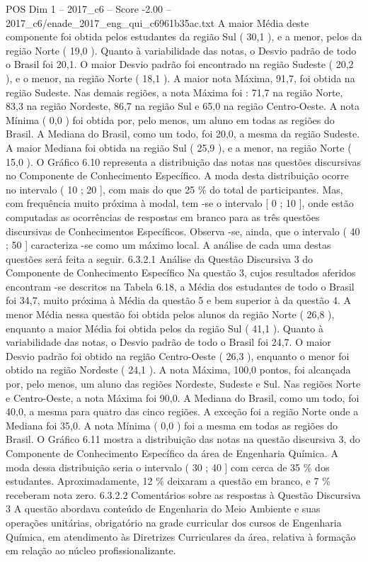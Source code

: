 \begin{textsample}{POS Dim 1 – 2017\_c6 – Score -2.00 – 2017\_c6/enade\_2017\_eng\_qui\_c6961b35ac.txt}
A maior Média deste componente foi obtida pelos estudantes da região Sul ( 30,1 ), e a menor, pelos da região Norte ( 19,0 ).
Quanto à variabilidade das notas, o Desvio padrão de todo o Brasil foi 20,1.
O maior Desvio padrão foi encontrado na região Sudeste ( 20,2 ), e o menor, na região Norte ( 18,1 ).
A maior nota Máxima, 91,7, foi obtida na região Sudeste.
Nas demais regiões, a nota Máxima foi : 71,7 na região Norte, 83,3 na região Nordeste, 86,7 na região Sul e 65,0 na região Centro-Oeste.
A nota Mínima ( 0,0 ) foi obtida por, pelo menos, um aluno em todas as regiões do Brasil.
A Mediana do Brasil, como um todo, foi 20,0, a mesma da região Sudeste.
A maior Mediana foi obtida na região Sul ( 25,9 ), e a menor, na região Norte ( 15,0 ).
O Gráfico 6.10 representa a distribuição das notas nas questões discursivas no Componente de Conhecimento Específico.
A moda desta distribuição ocorre no intervalo ( 10 ; 20 ], com mais do que 25 \% do total de participantes.
Mas, com frequência muito próxima à modal, tem -se o intervalo [ 0 ; 10 ], onde estão computadas as ocorrências de respostas em branco para as três questões discursivas de Conhecimentos Específicos.
Observa -se, ainda, que o intervalo ( 40 ; 50 ] caracteriza -se como um máximo local.
A análise de cada uma destas questões será feita a seguir. 6.3.2.1 Análise da Questão Discursiva 3 do Componente de Conhecimento Específico Na questão 3, cujos resultados aferidos encontram -se descritos na Tabela 6.18, a Média dos estudantes de todo o Brasil foi 34,7, muito próxima à Média da questão 5 e bem superior à da questão 4.
A menor Média nessa questão foi obtida pelos alunos da região Norte ( 26,8 ), enquanto a maior Média foi obtida pelos da região Sul ( 41,1 ).
Quanto à variabilidade das notas, o Desvio padrão de todo o Brasil foi 24,7.
O maior Desvio padrão foi obtido na região Centro-Oeste ( 26,3 ), enquanto o menor foi obtido na região Nordeste ( 24,1 ).
A nota Máxima, 100,0 pontos, foi alcançada por, pelo menos, um aluno das regiões Nordeste, Sudeste e Sul.
Nas regiões Norte e Centro-Oeste, a nota Máxima foi 90,0.
A Mediana do Brasil, como um todo, foi 40,0, a mesma para quatro das cinco regiões.
A exceção foi a região Norte onde a Mediana foi 35,0.
A nota Mínima ( 0,0 ) foi a mesma em todas as regiões do Brasil.
O Gráfico 6.11 mostra a distribuição das notas na questão discursiva 3, do Componente de Conhecimento Específico da área de Engenharia Química.
A moda dessa distribuição seria o intervalo ( 30 ; 40 ] com cerca de 35 \% dos estudantes.
Aproximadamente, 12 \% deixaram a questão em branco, e 7 \% receberam nota zero. 6.3.2.2 Comentários sobre as respostas à Questão Discursiva 3 A questão abordava conteúdo de Engenharia do Meio Ambiente e suas operações unitárias, obrigatório na grade curricular dos cursos de Engenharia Química, em atendimento às Diretrizes Curriculares da área, relativa à formação em relação ao núcleo profissionalizante.

\end{textsample}
